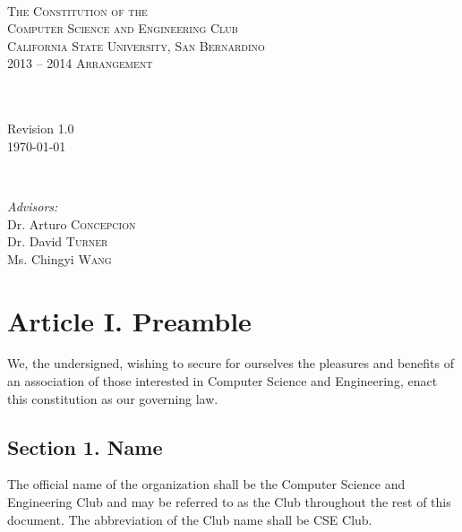 \documentclass{article}
\begin{document}
\begin{titlepage}
\begin{center}

~ \\[2cm]
\textsc{\LARGE The Constitution of the}\\[0.5cm]
\textsc{\LARGE Computer Science and Engineering Club}\\[1.0cm]
\textsc{\large California State University, San Bernardino}\\[5cm]
\textsc{\Large 2013 -- 2014 Arrangement}\\[9.2cm]

\begin{minipage}{0.4\textwidth}
\begin{flushleft} \large
~\\
~\\
Revision 1.0 \\
\today
\end{flushleft}
\end{minipage}
~
\begin{minipage}{0.55\textwidth}
\begin{flushright} \large
\emph{Advisors:} \\
Dr. Arturo \textsc{Concepcion}\\
Dr. David \textsc{Turner}\\
Ms. Chingyi \textsc{Wang}
\end{flushright}
\end{minipage}
\end{center}
\end{titlepage}

\newpage
\tableofcontents

\newpage

\section{Article I. Preamble}
  We, the undersigned, wishing to secure for ourselves the pleasures and benefits of an association of those interested in Computer Science and Engineering, enact this constitution as our governing law.

  \subsection{Section 1. Name}
    The official name of the organization shall be the Computer Science and Engineering Club and may be referred to as the Club throughout the rest of this document. The abbreviation of the Club name shall be CSE Club.
\end{document}
